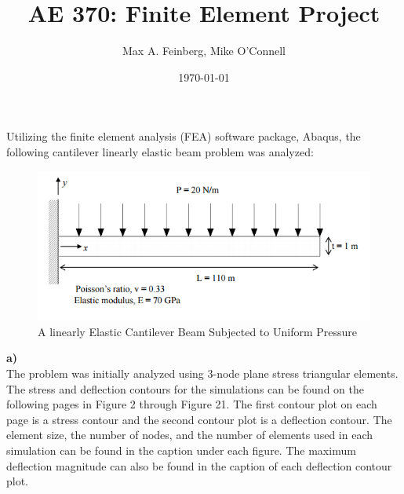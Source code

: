 \documentclass[a4paper]{article}
\title{AE 370: Finite Element Project}
\author{Max A. Feinberg, Mike O'Connell}
\date{\AdvanceDate[-1]\today}
\begin{document}
\maketitle

Utilizing the finite element analysis (FEA) software package, Abaqus, the following cantilever linearly elastic beam problem was analyzed:

\begin{figure}[ht]
\centering
\includegraphics[scale=.75]{beam.PNG}
\caption{A linearly Elastic Cantilever Beam Subjected to Uniform Pressure}
\end{figure}
\textbf{a)}\\

The problem was initially analyzed using 3-node plane stress triangular elements.  The stress and deflection contours for the simulations can be found on the following pages in Figure 2 through Figure 21.  The first contour plot on each page is a stress contour and the second contour plot is a deflection contour.  The element size, the number of nodes, and the number of elements used in each simulation can be found in the caption under each figure. The maximum deflection magnitude can also be found in the caption of each deflection contour plot.
\end{document}
